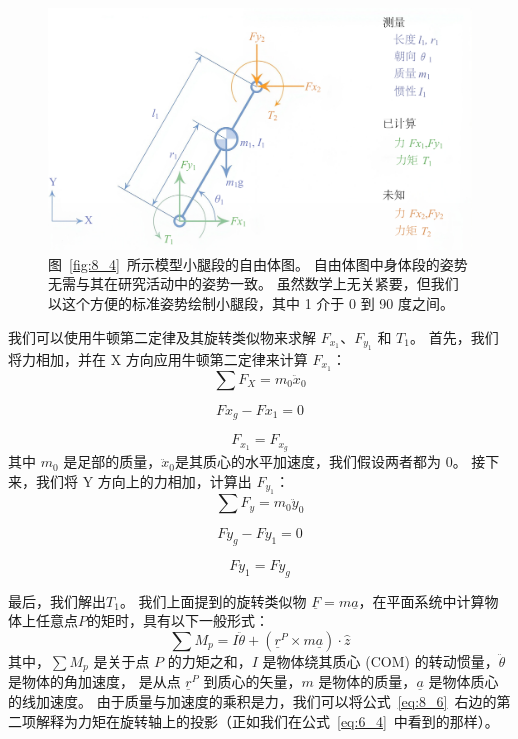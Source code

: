 \begin{figure}[!htb]
	\centering
	\includegraphics[width=0.7\linewidth]{chap8/8_6}
	\caption{图~\ref{fig:8_4}~所示模型小腿段的自由体图。
		自由体图中身体段的姿势无需与其在研究活动中的姿势一致。
		虽然数学上无关紧要，但我们以这个方便的标准姿势绘制小腿段，其中 1 介于 0 到 90 度之间。 \label{fig:8_6}}
\end{figure}


我们可以使用牛顿第二定律及其旋转类似物来求解 $F_{x_1}$、$F_{y_1}$ 和 $T_1$。
首先，我们将力相加，并在 X 方向应用牛顿第二定律来计算 $F_{x_1}$：
%
\begin{equation}
	\sum F_X = m_0 \ddot{x}_0
	\label{eq:8_4a}
\end{equation}


\begin{equation}
	F x_g - F x_1 = 0
	\label{eq:8_4b}
\end{equation}


\begin{equation}
	F_{x_1} = F_{x_g}
	\label{eq:8_4c}
\end{equation}
%
其中 $m_0$ 是足部的质量，$\ddot{x}_0$是其质心的水平加速度，我们假设两者都为 0。
接下来，我们将 Y 方向上的力相加，计算出 $F_{y_1}$：
%
\begin{equation}
	\sum F_y = m_0 \ddot{y}_0
	\label{eq:8_5a}
\end{equation}

\begin{equation}
	F y_g - F y_1 = 0
	\label{eq:8_5b}
\end{equation}

\begin{equation}
	F y_1 = F y_g
	\label{eq:8_5c}
\end{equation}

最后，我们解出$T_1$。
我们上面提到的旋转类似物 $\underline{F} = m \underline{a}$，在平面系统中计算物体上任意点$P$的矩时，具有以下一般形式：
%
\begin{equation}
	\sum M_p = 
		I \ddot{\theta} + 
			( \underline{r}^P \times m \underline{a} ) \cdot \hat{z}
	\label{eq:8_6}
\end{equation}
%
其中，$\sum M_p$ 是关于点 $P$ 的力矩之和，$I$ 是物体绕其质心 (COM) 的转动惯量，$\ddot{\theta}$ 是物体的角加速度， 是从点 $\underline{r} ^P$ 到质心的矢量，$m$ 是物体的质量，$\underline{a}$ 是物体质心的线加速度。
由于质量与加速度的乘积是力，我们可以将公式~\ref{eq:8_6}~右边的第二项解释为力矩在旋转轴上的投影（正如我们在公式~\ref{eq:6_4}~中看到的那样）。


